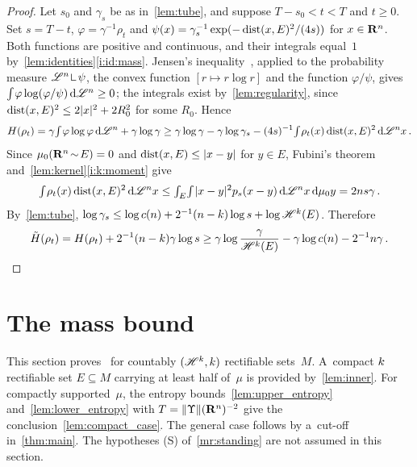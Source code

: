 \documentclass[a4paper,twoside,leqno]{article}
\begin{document}
\begin{proof}
    Let $s_0$ and $\gamma_s$ be as in~\ref{lem:tube}, and suppose $T - s_0 < t < T$ and $t \ge 0$.
    Set $s = T - t$, $\varphi = \gamma^{-1} \rho_t$ and $\psi(x) = \gamma_s^{-1} \exp(-\operatorname{dist}(x,E)^2
    / (4s))$ for $x \in \mathbf{R}^{n}$. Both functions are positive and continuous, and their
    integrals equal~$1$ by~\ref{lem:identities}\ref{i:id:mass}. Jensen's
    inequality~\cite[2.4.19]{Federer1969}, applied to the probability measure $\LM^{\adim}
    \restrict \psi$, the convex function $[r \mapsto r \log r]$ and the function $\varphi/\psi$,
    gives ${\textstyle\int_{}^{}} \varphi \log(\varphi/\psi) \,\mathrm{d} \mathscr{L}^{n} \ge 0$; the integrals exist
    by~\ref{lem:regularity}, since $\operatorname{dist}(x,E)^2 \le 2 |x|^2 + 2 R_0^2$ for some $R_0$. Hence
    \begin{displaymath}
        H(\rho_t) = \gamma {\textstyle\int_{}^{}} \varphi \log \varphi \,\mathrm{d} \mathscr{L}^{n} + \gamma \log \gamma
        \ge \gamma \log \gamma - \gamma \log \gamma_s - (4s)^{-1} {\textstyle\int_{}^{}} \rho_t(x)
        \operatorname{dist}(x,E)^2 \,\mathrm{d} \mathscr{L}^{n} x \,.
    \end{displaymath}
    Since $\mu_0(\mathbf{R}^{n} \!\sim\! E) = 0$ and $\operatorname{dist}(x,E) \le |x - y|$ for $y \in E$, Fubini's
    theorem~\cite[2.6.2]{Federer1969} and~\ref{lem:kernel}\ref{i:k:moment} give
    \begin{displaymath}
        {\textstyle\int_{}^{}} \rho_t(x) \operatorname{dist}(x,E)^2 \,\mathrm{d} \mathscr{L}^{n} x \le {\textstyle\int_{E}^{}} {\textstyle\int_{}^{}} |x -
        y|^2 p_s(x-y) \,\mathrm{d} \mathscr{L}^{n} x \,\mathrm{d} \mu_0 y = 2 n s \gamma \,.
    \end{displaymath}
    By~\ref{lem:tube}, $\log \gamma_s \le \log c(n) + 2^{-1}(n - k) \log s + \log
    \mathscr{H}^{k}(E)$. Therefore
    \begin{displaymath}
        \tilde H(\rho_t) = H(\rho_t) + 2^{-1} (n - k) \gamma \log s \ge \gamma \log
        \frac{\gamma}{\mathscr{H}^{k}(E)} - \gamma \log c(n) - 2^{-1} n \gamma \,.
        \qedhere
    \end{displaymath}
\end{proof}

\section{The mass bound}
\label{sec:main}

\begin{miniremark}
    \label{mr:sec_main}
    This section proves~\cite[Theorem~1.1]{DePhilippisGennaioliPigatiRindler2026} for countably
    $(\mathscr{H}^{k},k)$ rectifiable sets~$M$. A~compact $k$ rectifiable set $E \subseteq M$
    carrying at least half of~$\mu$ is provided by~\ref{lem:inner}. For compactly supported~$\mu$,
    the entropy bounds~\ref{lem:upper_entropy} and~\ref{lem:lower_entropy} with $T =
    \|\Upsilon\|(\mathbf{R}^{n})^{-2}$ give the conclusion~\ref{lem:compact_case}. The general case
    follows by a~cut-off in~\ref{thm:main}. The hypotheses (S) of~\ref{mr:standing} are not
    assumed in this section.
\end{miniremark}
\end{document}
